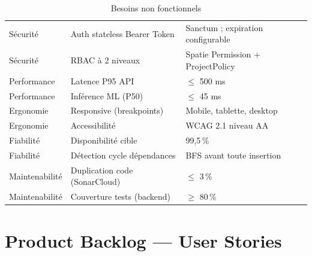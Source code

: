 \begin{table}[H]
  \centering
  \caption{Besoins non fonctionnels}
  \label{tab:bnf}
  \begin{tabularx}{\textwidth}{L{3cm}L{5cm}X}
    \toprule
     &  &  \\
    \midrule
    Sécurité     & Auth stateless Bearer Token         & Sanctum ; expiration configurable \\
    Sécurité     & RBAC à 2 niveaux                   & Spatie Permission + ProjectPolicy \\
    Performance  & Latence P95 API                    & $\leq$ 500 ms \\
    Performance  & Inférence ML (P50)                 & $\leq$ 45 ms \\
    Ergonomie    & Responsive (breakpoints)           & Mobile, tablette, desktop \\
    Ergonomie    & Accessibilité                      & WCAG 2.1 niveau AA \\
    Fiabilité    & Disponibilité cible                & 99,5\,\% \\
    Fiabilité    & Détection cycle dépendances        & BFS avant toute insertion \\
    Maintenabilité & Duplication code (SonarCloud)    & $\leq$ 3\,\% \\
    Maintenabilité & Couverture tests (backend)       & $\geq$ 80\,\% \\
    \bottomrule
  \end{tabularx}
\end{table}

\section{Product Backlog — User Stories}

